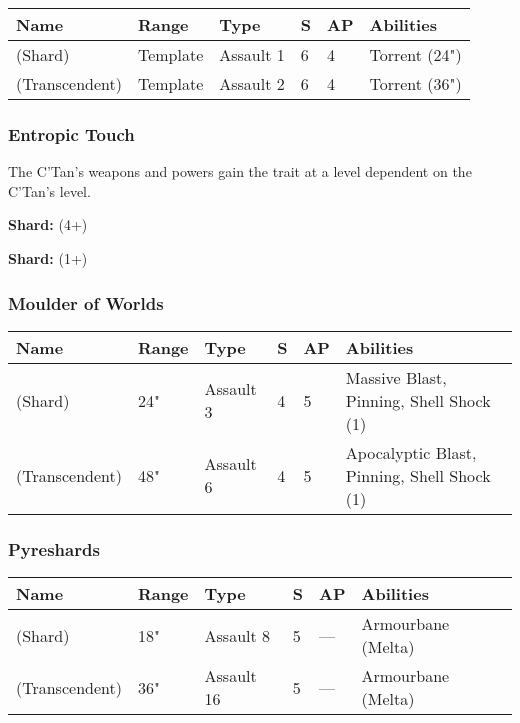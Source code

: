 \noindent
\begin{tabular}{||m{160pt} m{31pt} m{55pt} m{12pt} m{12pt} m{200pt}||}
	\hline
	Name & Range & Type & S & AP & Abilities \\
	\hline
	\quickref{Cosmic Fire} (Shard) & Template & Assault 1 & 6 & 4 & Torrent (24") \\
	\quickref{Cosmic Fire} (Transcendent) & Template & Assault 2 & 6 & 4 & Torrent (36") \\
	\hline
\end{tabular}

\subsubsection{Entropic Touch} \label{Entropic Touch}

The C'Tan's weapons and powers gain the  trait at a level dependent on the C'Tan's level.

\textbf{Shard:}  (4+)

\textbf{Shard:}  (1+)

\subsubsection{Moulder of Worlds} \label{Moulder of Worlds}

\noindent
\begin{tabular}{||m{160pt} m{31pt} m{55pt} m{12pt} m{12pt} m{200pt}||}
	\hline
	Name & Range & Type & S & AP & Abilities \\
	\hline
	\quickref{Moulder of Worlds} (Shard) & 24" & Assault 3 & 4 & 5 & Massive Blast, Pinning, Shell Shock (1) \\
	\quickref{Moulder of Worlds} (Transcendent) & 48" & Assault 6 & 4 & 5 & Apocalyptic Blast, Pinning, Shell Shock (1) \\
	\hline
\end{tabular}

\subsubsection{Pyreshards} \label{Pyreshards}

\noindent
\begin{tabular}{||m{160pt} m{31pt} m{55pt} m{12pt} m{12pt} m{200pt}||}
	\hline
	Name & Range & Type & S & AP & Abilities \\
	\hline
	\quickref{Pyreshards} (Shard) & 18" & Assault 8 & 5 & — & Armourbane (Melta) \\
	\quickref{Pyreshards} (Transcendent) & 36" & Assault 16 & 5 & — & Armourbane (Melta) \\
	\hline
\end{tabular}

